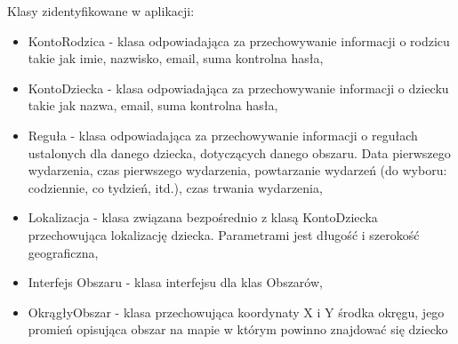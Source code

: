 \documentclass{sprawozdanie-agh}
\begin{document}
		Klasy zidentyfikowane w aplikacji:
		\begin{itemize}
			\item KontoRodzica - klasa odpowiadająca za przechowywanie informacji o rodzicu takie jak imie, nazwisko, email, suma kontrolna hasła,
			\item KontoDziecka - klasa odpowiadająca za przechowywanie informacji o dziecku takie jak nazwa, email, suma kontrolna hasła,
			\item Reguła - klasa odpowiadająca za przechowywanie informacji o regułach ustalonych dla danego dziecka, dotyczących danego obszaru. Data pierwszego wydarzenia, czas pierwszego wydarzenia, powtarzanie wydarzeń (do wyboru: codziennie, co tydzień, itd.), czas trwania wydarzenia,
			\item Lokalizacja - klasa związana bezpośrednio z klasą KontoDziecka przechowująca lokalizację dziecka. Parametrami jest długość i szerokość geograficzna,
			\item Interfejs Obszaru - klasa interfejsu dla klas Obszarów,
			\item OkrągłyObszar - klasa przechowująca koordynaty X i Y środka okręgu, jego promień opisująca obszar na mapie w którym powinno znajdować się dziecko
		\end{itemize}
\end{document}
